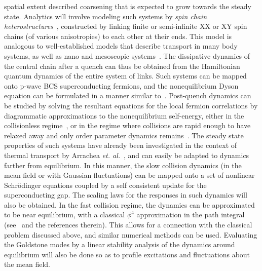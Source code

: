 \documentclass[a4paper,11pt,color]{article}
\begin{document}
spatial extent described coarsening that is expected to grow towards the steady state. Analytics will involve modeling such systems by \textit{spin chain heterostructures}~\cite{arrachea},  constructed by linking finite or semi-infinite XX or XY spin chains (of various anisotropies) to each other at their ends. This model is analogous to well-established models that describe transport in many body systems, as well as nano and mesoscopic systems~\cite{arrachea,openspin, imry}. The dissipative dynamics of the central chain after a quench can thus be obtained from the Hamiltonian quantum dynamics of the entire system of links. Such systems can be mapped onto p-wave BCS superconducting fermions, and the nonequilibrium Dyson equation can be formulated in a manner similar to~\cite{gorkov, volkov}. Post-quench dynamics can be studied by solving the resultant equations for the local fermion correlations by diagrammatic approximations to the nonequilibrium self-energy, either in the collisionless regime~\cite{volkov,
ncnsd2012}, or in the regime where collisions are rapid enough to have relaxed away and only order parameter dynamics remains~\cite{ncnsd2012}. The steady state properties of such systems have already been investigated in the context of thermal transport by Arrachea \textit{et. al.}~\cite{arrachea}, and can easily be adapted to dynamics farther from equilibrium. In this manner, the slow collision dynamics (in the mean field or with Gaussian fluctuations) can be mapped onto a set of nonlinear Schr\"odinger equations coupled by a self consistent update for the superconducting gap. The scaling laws for the responses in such dynamics will also be obtained.  In the fast collision regime, the dynamics can be approximated to be near equilibrium, with a classical $\phi^4$ approximation in the path integral (see~\cite{colrev} and the references therein). This allows for a connection with the classical problem discussed above, and similar numerical methods can be used. Evaluating the Goldstone modes by a linear 
stability analysis of the dynamics around equilibrium will also be done so as to profile excitations and fluctuations about the mean field.
\end{document}
